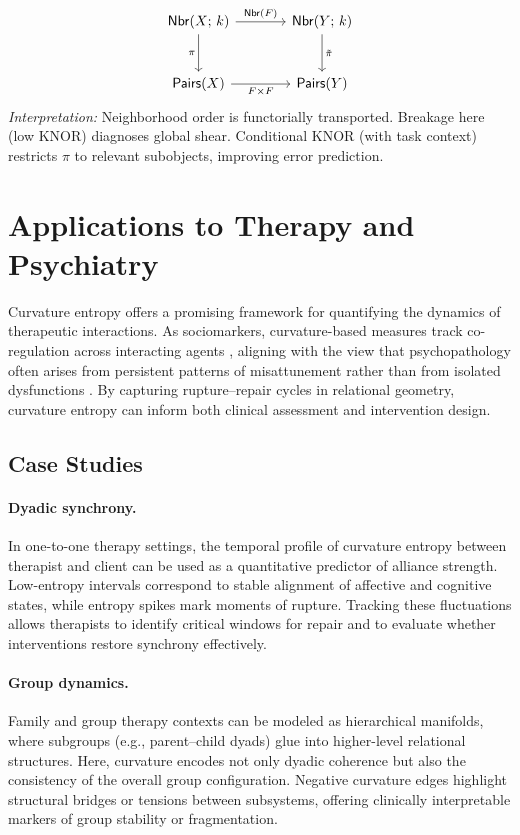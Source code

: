 \documentclass{article}
\theoremstyle{definition}
\begin{document}
\[
\begin{tikzcd}[column sep=large,row sep=large]
\mathsf{Nbr}(X;\,k)
  \arrow[r,"\mathsf{Nbr}(F)"]
  \arrow[d,swap,"\pi"]
&
\mathsf{Nbr}(Y;\,k)
  \arrow[d,"\tilde{\pi}"]
\\
\mathsf{Pairs}(X)
  \arrow[r,swap,"F\times F"]
&
\mathsf{Pairs}(Y)
\end{tikzcd}
\]
\noindent
\textit{Interpretation:} Neighborhood order is functorially transported.
Breakage here (low KNOR) diagnoses global shear. Conditional KNOR (with task
context) restricts $\pi$ to relevant subobjects, improving error prediction.



\section{Applications to Therapy and Psychiatry}

Curvature entropy offers a promising framework for quantifying the dynamics of
therapeutic interactions. As sociomarkers, curvature-based measures track
co-regulation across interacting agents \cite{adel2025systematic}, aligning
with the view that psychopathology often arises from persistent patterns of
misattunement rather than from isolated dysfunctions
\cite{bolis2017dialectical}. By capturing rupture–repair cycles in relational
geometry, curvature entropy can inform both clinical assessment and
intervention design.

\subsection{Case Studies}

\paragraph{Dyadic synchrony.}  
In one-to-one therapy settings, the temporal profile of curvature entropy
between therapist and client can be used as a quantitative predictor of
alliance strength. Low-entropy intervals correspond to stable alignment of
affective and cognitive states, while entropy spikes mark moments of rupture.
Tracking these fluctuations allows therapists to identify critical windows for
repair and to evaluate whether interventions restore synchrony effectively.

\paragraph{Group dynamics.}  
Family and group therapy contexts can be modeled as hierarchical manifolds,
where subgroups (e.g., parent–child dyads) glue into higher-level relational
structures. Here, curvature encodes not only dyadic coherence but also the
consistency of the overall group configuration. Negative curvature edges
highlight structural bridges or tensions between subsystems, offering
clinically interpretable markers of group stability or fragmentation.
\end{document}

